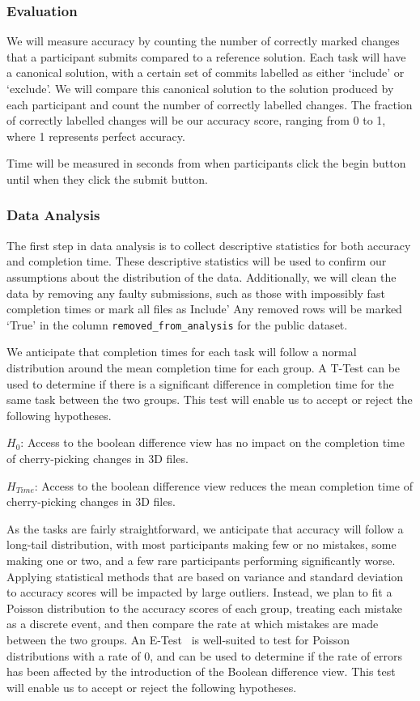 \documentclass[sigconf,authorversion,nonacm]{acmart}
\begin{document}
\subsubsection{Evaluation}

We will measure accuracy by counting the number of correctly marked changes that a participant submits compared to a reference solution.
Each task will have a canonical solution, with a certain set of commits labelled as either `include' or `exclude'.
We will compare this canonical solution to the solution produced by each participant and count the number of correctly labelled changes.
The fraction of correctly labelled changes will be our accuracy score, ranging from 0 to 1, where 1 represents perfect accuracy.

Time will be measured in seconds from when participants click the begin button until when they click the submit button.

\subsubsection{Data Analysis}

The first step in data analysis is to collect descriptive statistics for both accuracy and completion time.
These descriptive statistics will be used to confirm our assumptions about the distribution of the data.
Additionally, we will clean the data by removing any faulty submissions, such as those with impossibly fast completion times or mark all files as Include'
Any removed rows will be marked `True' in the column \texttt{removed\_from\_analysis} for the public dataset.

We anticipate that completion times for each task will follow a normal distribution around the mean completion time for each group.
A T-Test can be used to determine if there is a significant difference in completion time for the same task between the two groups.
This test will enable us to accept or reject the following hypotheses.

$H_{0}$: Access to the boolean difference view has no impact on the completion time of cherry-picking changes in 3D files.

$H_{Time}$: Access to the boolean difference view reduces the mean completion time of cherry-picking changes in 3D files.

As the tasks are fairly straightforward, we anticipate that accuracy will follow a long-tail distribution, with most participants making few or no mistakes, some making one or two, and a few rare participants performing significantly worse.
Applying statistical methods that are based on variance and standard deviation to accuracy scores will be impacted by large outliers.
Instead, we plan to fit a Poisson distribution to the accuracy scores of each group, treating each mistake as a discrete event, and then compare the rate at which mistakes are made between the two groups.
An E-Test~\cite{krishnamoorthy2004more} is well-suited to test for Poisson distributions with a rate of 0, and can be used to determine if the rate of errors has been affected by the introduction of the Boolean difference view. This test will enable us to accept or reject the following hypotheses.
\end{document}
